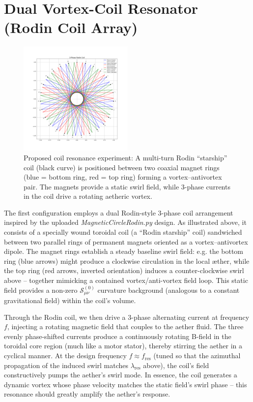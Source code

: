 \documentclass[twocolumn,aps,pre,floatfix,nofootinbib]{revtex4-2}
\begin{document}
\section*{Dual Vortex-Coil Resonator (Rodin Coil Array)}



\begin{figure}[h]
\centering
\includegraphics[width=0.5\textwidth]{exports/02_Starship-3phase-27x3points_030557}
\caption{Proposed coil resonance experiment: A multi-turn Rodin “starship” coil (black curve) is positioned between two coaxial magnet rings (blue = bottom ring, red = top ring) forming a vortex–antivortex pair. The magnets provide a static swirl field, while 3-phase currents in the coil drive a rotating aetheric vortex.}
\end{figure}


The first configuration employs a dual Rodin-style 3-phase coil arrangement inspired by the uploaded \textit{MagneticCircleRodin.py} design. As illustrated above, it consists of a specially wound toroidal coil (a “Rodin starship” coil) sandwiched between two parallel rings of permanent magnets oriented as a vortex–antivortex dipole. The magnet rings establish a steady baseline swirl field: e.g. the bottom ring (blue arrows) might produce a clockwise circulation in the local æther, while the top ring (red arrows, inverted orientation) induces a counter-clockwise swirl above – together mimicking a contained vortex/anti-vortex field loop. This static field provides a non-zero $\mathcal{S}_{\mu\nu}^{(0)}$ curvature background (analogous to a constant gravitational field) within the coil’s volume.


Through the Rodin coil, we then drive a 3-phase alternating current at frequency $f$, injecting a rotating magnetic field that couples to the aether fluid. The three evenly phase-shifted currents produce a continuously rotating B-field in the toroidal core region (much like a motor stator), thereby stirring the aether in a cyclical manner. At the design frequency $f \approx f_\textrm{res}$ (tuned so that the azimuthal propagation of the induced swirl matches $\lambda_\textrm{res}$ above), the coil’s field constructively pumps the aether’s swirl mode. In essence, the coil generates a dynamic vortex whose phase velocity matches the static field’s swirl phase – this resonance should greatly amplify the aether’s response.
\end{document}
